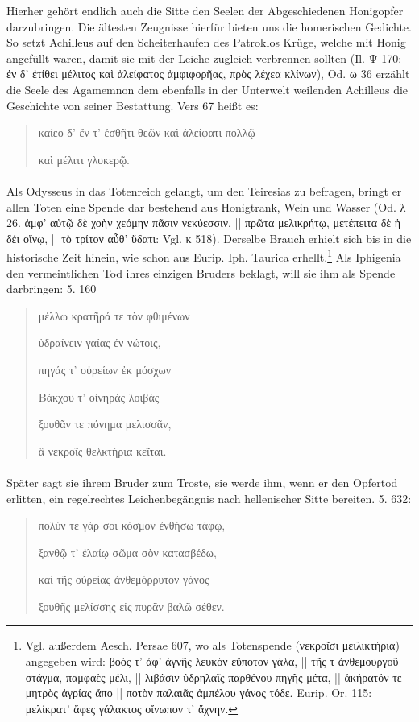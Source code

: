 \documentclass[a4paper, 11pt, oneside]{article}
\begin{document}
Hierher gehört endlich auch die Sitte den Seelen der Abgeschiedenen Honigopfer darzubringen. Die ältesten Zeugnisse hierfür bieten uns die homerischen Gedichte. So setzt Achilleus auf den Scheiterhaufen des Patroklos Krüge, welche mit Honig angefüllt waren, damit sie mit der Leiche zugleich verbrennen sollten (Il. Ψ 170: ἐν δ' ἐτίθει μέλιτος καὶ ἀλείφατος ἀμφιφορῆας, πρὸς λέχεα κλίνων), Od. ω 36 erzählt die Seele des Agamemnon dem ebenfalls in der Unterwelt weilenden Achilleus die Geschichte von seiner Bestattung. Vers 67 heißt es:
\begin{quotation}
καίεο δ' ἔν τ' ἐσθῆτι θεῶν καὶ ἀλείφατι πολλῷ

καὶ μέλιτι γλυκερῷ.
\end{quotation}
\paragraph{}
Als Odysseus in das Totenreich gelangt, um den Teiresias zu befragen, bringt er allen Toten eine Spende dar bestehend aus Honigtrank, Wein und Wasser (Od. λ 26. ἀμφ' αὐτῷ δὲ χοὴν χεόμην πᾶσιν νεκύεσσιν, || πρῶτα μελικρήτῳ, μετέπειτα δὲ ἡ δέι οἴνῳ, || τὸ τρίτον αὖθ' ὕδατι: Vgl. κ 518). Derselbe Brauch erhielt sich bis in die historische Zeit hinein, wie schon aus Eurip. Iph. Taurica erhellt.\footnote{Vgl. außerdem Aesch. Persae 607, wo als Totenspende (νεκροῖσι μειλικτήρια) angegeben wird: βοός τ' ἀφ' ἀγνῆς λευκὸν εὔποτον γάλα, || τῆς τ ἀνθεμουργοῦ στάγμα, παμφαὲς μέλι, || λιβάσιν ὑδρηλαῖς παρθένου πηγῆς μέτα, || ἀκήρατόν τε μητρὸς ἀγρίας ἄπο || ποτὸν παλαιᾶς ἀμπέλου γάνος τόδε. Eurip. Or. 115: μελίκρατ' ἄφες γάλακτος οἴνωπον τ' ἄχνην.} Als Iphigenia den vermeintlichen Tod ihres einzigen Bruders beklagt, will sie ihm als Spende darbringen: 5. 160
\begin{quotation}
μέλλω κρατῆρά τε τὸν φθιμένων

ὑδραίνειν γαίας ἐν νώτοις,

πηγάς τ' οὐρείων ἐκ μόσχων

Βάκχου τ' οἰνηρὰς λοιβὰς

ξουθᾶν τε πόνημα μελισσᾶν,

ἃ νεκροῖς θελκτήρια κεῖται.
\end{quotation}
\paragraph{}
Später sagt sie ihrem Bruder zum Troste, sie werde ihm, wenn er den Opfertod erlitten, ein regelrechtes Leichenbegängnis nach hellenischer Sitte bereiten. 5. 632:
\begin{quotation}
πολύν τε γάρ σοι κόσμον ἐνθήσω τάφῳ,

ξανθῷ τ' ἐλαίῳ σῶμα σὸν κατασβέδω,

καὶ τῆς οὐρείας ἀνθεμόρρυτον γάνος

ξουθῆς μελίσσης εἰς πυρᾶν βαλῶ σέθεν.
\end{quotation}
\end{document}
